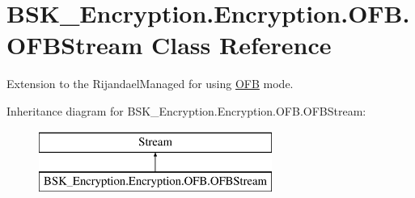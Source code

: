\hypertarget{class_b_s_k___encryption_1_1_encryption_1_1_o_f_b_1_1_o_f_b_stream}{}\section{B\+S\+K\+\_\+\+Encryption.\+Encryption.\+O\+F\+B.\+O\+F\+B\+Stream Class Reference}
\label{class_b_s_k___encryption_1_1_encryption_1_1_o_f_b_1_1_o_f_b_stream}


Extension to the Rijandael\+Managed for using \mbox{\hyperlink{namespace_b_s_k___encryption_1_1_encryption_1_1_o_f_b}{O\+FB}} mode.  


Inheritance diagram for B\+S\+K\+\_\+\+Encryption.\+Encryption.\+O\+F\+B.\+O\+F\+B\+Stream\+:\begin{figure}[H]
\begin{center}
\leavevmode
\includegraphics[height=2.000000cm]{class_b_s_k___encryption_1_1_encryption_1_1_o_f_b_1_1_o_f_b_stream}
\end{center}
\end{figure}
